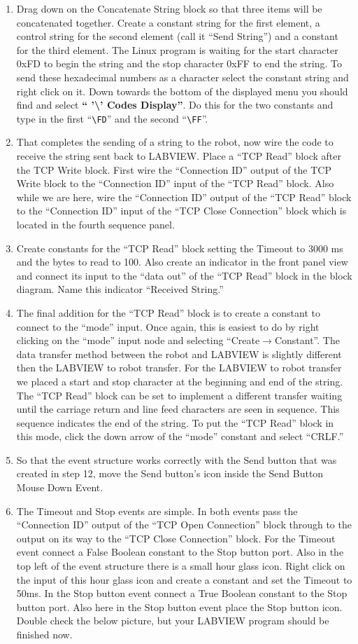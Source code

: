 \documentclass[11pt]{article}
\begin{document}
\begin{enumerate}
    \item Drag down on the Concatenate String block so that three items will be concatenated together. Create a constant string for the first element, a control string for the second element (call it “Send String”) and a constant for the third element. The Linux program is waiting for the start character 0xFD to begin the string and the stop character 0xFF to end the string. To send these hexadecimal numbers as a character select the constant string and right click on it. Down towards the bottom of the displayed menu you should find and select \textbf{“ ’\textbackslash’ Codes Display”}. Do this for the two constants and type in the first “\lstinline|\FD|” and the second “\lstinline|\FF|”.
    \item That completes the sending of a string to the robot, now wire the code to receive the string sent back to LABVIEW. Place a “TCP Read” block after the TCP Write block. First wire the “Connection ID” output of the TCP Write block to the “Connection ID” input of the “TCP Read” block. Also while we are here, wire the “Connection ID” output of the “TCP Read” block to the “Connection ID” input of the “TCP Close Connection” block which is located in the fourth sequence panel.
    \item Create constants for the “TCP Read” block setting the Timeout to 3000 ms and the bytes to read to 100. Also create an indicator in the front panel view and connect its input to the “data out” of the “TCP Read” block in the block diagram. Name this indicator “Received String.”
    \item The final addition for the “TCP Read” block is to create a constant to connect to the “mode” input. Once again, this is easiest to do by right clicking on the “mode” input node and selecting “Create$\rightarrow$Constant”. The data transfer method between the robot and LABVIEW is slightly different then the LABVIEW to robot transfer. For the LABVIEW to robot transfer we placed a start and stop character at the beginning and end of the string. The “TCP Read” block can be set to implement a different transfer waiting until the carriage return and line feed characters are seen in sequence. This sequence indicates the end of the string. To put the “TCP Read” block in this mode, click the down arrow of the “mode” constant and select “CRLF.”
    \item So that the event structure works correctly with the Send button that was created in step 12, move the Send button’s icon inside the Send Button Mouse Down Event.
    \item The Timeout and Stop events are simple. In both events pass the “Connection ID” output of the “TCP Open Connection” block through to the output on its way to the “TCP Close Connection” block. For the Timeout event connect a False Boolean constant to the Stop button port. Also in the top left of the event structure there is a small hour glass icon. Right click on the input of this hour glass icon and create a constant and set the Timeout to 50ms. In the Stop button event connect a True Boolean constant to the Stop button port. Also here in the Stop button event place the Stop button icon. Double check the below picture, but your LABVIEW program should be finished now.

\end{enumerate}
\end{document}
